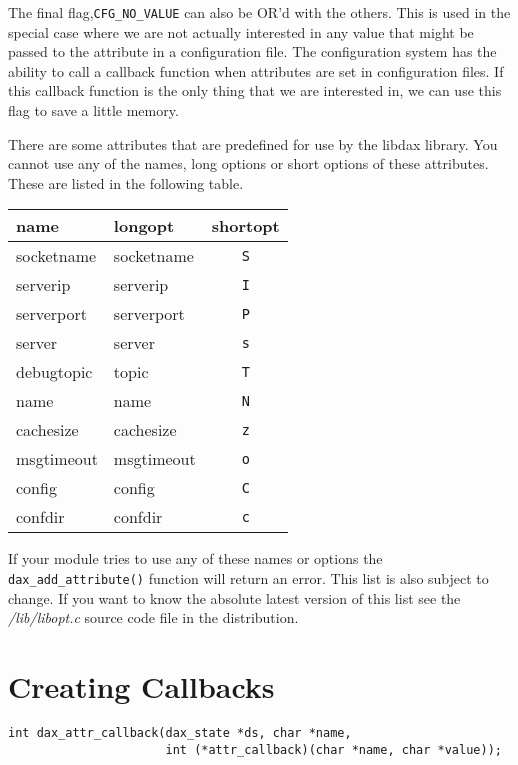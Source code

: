 The final flag,\verb|CFG_NO_VALUE| can also be OR'd with the others.  This is
used in the special case where we are not actually interested in any value that
might be passed to the attribute in a configuration file.  The configuration
system has the ability to call a callback function when attributes are set in
configuration files.  If this callback function is the only thing that we are
interested in, we can use this flag to save a little memory.

There are some attributes that are predefined for use by the libdax library.
You cannot use any of the names, long options or short options of these
attributes.  These are listed in the following table.

\begin{tabular}{|l|l|c|}
\hline \textbf{name} & \textbf{longopt} & \textbf{shortopt} \\
\hline socketname & socketname & \texttt{S} \\
\hline serverip & serverip & \texttt{I} \\
\hline serverport & serverport & \texttt{P} \\
\hline server & server & \texttt{s} \\
\hline debugtopic & topic & \texttt{T} \\
\hline name & name & \texttt{N} \\
\hline cachesize & cachesize & \texttt{z} \\
\hline msgtimeout & msgtimeout & \texttt{o} \\
\hline config\footnotemark & config & \texttt{C} \\
\hline confdir\footnotemark[\value{footnote}] & confdir & \texttt{c} \\
\hline
\end{tabular}

If your module tries to use any of these names or options the
\verb|dax_add_attribute()| function will return an error.  This list is also
subject to change.  If you want to know the absolute latest version of this list
see the \textit{/lib/libopt.c} source code file in the \opendax distribution.

\section{Creating Callbacks}
\begin{verbatim}
int dax_attr_callback(dax_state *ds, char *name,
                      int (*attr_callback)(char *name, char *value));
\end{verbatim}

